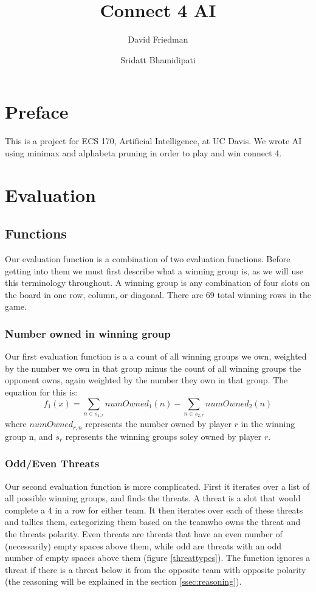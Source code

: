 \documentclass{article}
\title{Connect 4 AI}
\author{David Friedman \and Sridatt Bhamidipati}
\begin{document}
\maketitle
\newpage
\tableofcontents
\newpage

\section{Preface}
This is a project for ECS 170, Artificial Intelligence, at UC Davis. We wrote AI using minimax and alphabeta pruning in order to play and win connect 4.
	
\section{Evaluation}
\subsection{Functions}
Our evaluation function is a combination of two evaluation functions. Before getting into them we must first describe what a winning group is, as we will use this terminology throughout. A winning group is any combination of four slots on the board in one row, column, or diagonal. There are 69 total winning rows in the game.
\subsubsection{Number owned in winning group}
Our first evaluation function is a a count of all winning groups we own, weighted by the number we own in that group minus the count of all winning groups the opponent owns, again weighted by the number they own in that group. The equation for this is:
\[f_1(x)=\sum_{n \in s_{1,r}}{numOwned_1(n)}-\sum_{n \in s_{2,r}}{numOwned_2(n)}\]
where $numOwned_{r,n}$ represents the number owned by player $r$ in the winning group n, and $s_r$ represents the winning groups soley owned by player $r$.
\subsubsection{Odd/Even Threats}
Our second evaluation function is more complicated. First it iterates over a list of all possible winning groups, and finds the threats. A threat is a slot that would complete a 4 in a row for either team. It then iterates over each of these threats and tallies them, categorizing them based on the teamwho owns the threat and the threats polarity. Even threats are threats that have an even number of (necessarily) empty spaces above them, while odd are threats with an odd number of empty spaces above them (figure \ref{threattypes}). The function ignores a threat if there is a threat below it from the opposite team with opposite polarity (the reasoning will be explained in the section \ref{ssec:reasoning}). 
		
\end{document}
